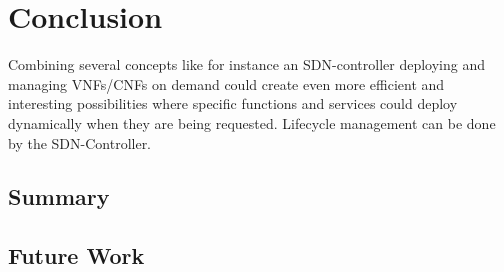 \section{Conclusion}
Combining several concepts like for instance an SDN-controller deploying and managing VNFs/CNFs  on demand could create even more efficient and interesting possibilities where specific functions and services could deploy dynamically when they are being requested. Lifecycle management can be done by the SDN-Controller. 

\subsection{Summary}
\subsection{Future Work}